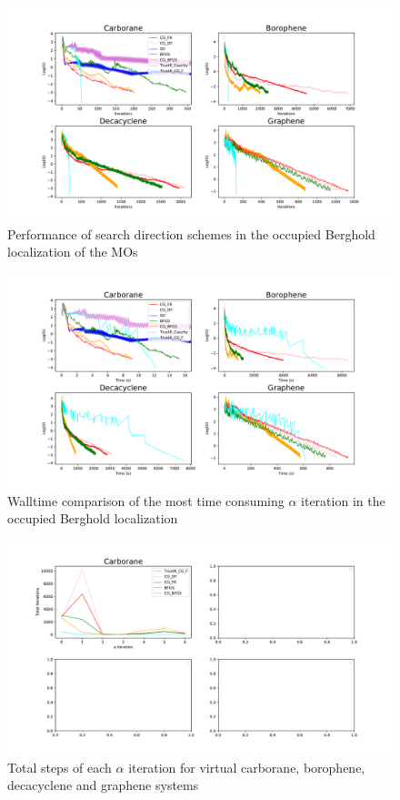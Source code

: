 \documentclass[aps,prl,reprint,amsmath,amssymb]{revtex4-1}
\begin{document}
\begin{figure}[htb]
\centering
\includegraphics[width=\textwidth]{occupied_grad.pdf}
\caption{Performance of search direction schemes in the occupied Berghold localization of the MOs}
\label{fig:occ_grad}
\end{figure}


\begin{figure}[htb]
\centering
\includegraphics[width=\textwidth]{occupied_walltime.pdf}
\caption{Walltime comparison of the most time consuming $\alpha$ iteration in the occupied Berghold localization}
\label{fig:occ_walltime}
\end{figure}


\begin{figure}[htb]
\centering
\includegraphics[width=\textwidth]{virtual_iter.pdf}
\caption{Total steps of each $\alpha$ iteration for virtual carborane, borophene, decacyclene and graphene systems}
\label{fig:vir_iter}
\end{figure}
\end{document}
